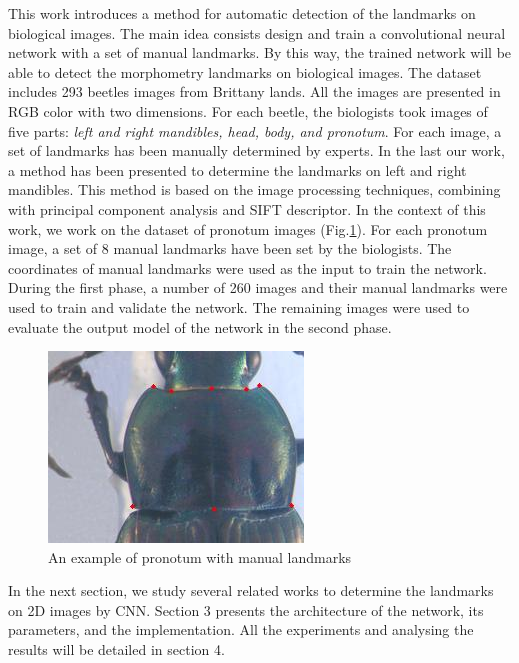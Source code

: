 \documentclass[conference]{IEEEtran}
\begin{document}
This work introduces a method for automatic detection of the landmarks on biological images. The main idea consists design and train a convolutional neural network\cite{lecun2010convolutional} with a set of manual landmarks. By this way, the trained network will be able to detect the morphometry landmarks on biological images. The dataset includes 293 beetles images from Brittany lands. All the images are presented in RGB color with two dimensions. For each beetle, the biologists took images of five parts: \textit{left and right mandibles, head, body, and pronotum}. For each image, a set of landmarks has been manually determined by experts. In the last our work, a method has been presented to determine the landmarks on left and right mandibles\cite{le2017maelab}. This method is based on the image processing techniques\cite{canny1986computational}, combining with principal component analysis\cite{shlens2014tutorial} and SIFT descriptor\cite{lowe2004distinctive}. In the context of this work, we work on the dataset of pronotum images (Fig.\ref{figpronotum}). For each pronotum image, a set of 8 manual landmarks have been set by the biologists. The coordinates of manual landmarks were used as the input to train the network. During the first phase, a number of 260 images and their manual landmarks were used to train and validate the network. The remaining images were used to evaluate the output model of the network in the second phase.
\begin{figure}[htbp]
	\centerline{\includegraphics[scale=0.8]{images/pronotum}}
	\caption{An example of pronotum with manual landmarks}
	\label{figpronotum}
\end{figure}

In the next section, we study several related works to determine the landmarks on 2D images by CNN. Section 3 presents the architecture of the network, its parameters, and the implementation. All the experiments and analysing the results will be detailed in section 4.
\end{document}
